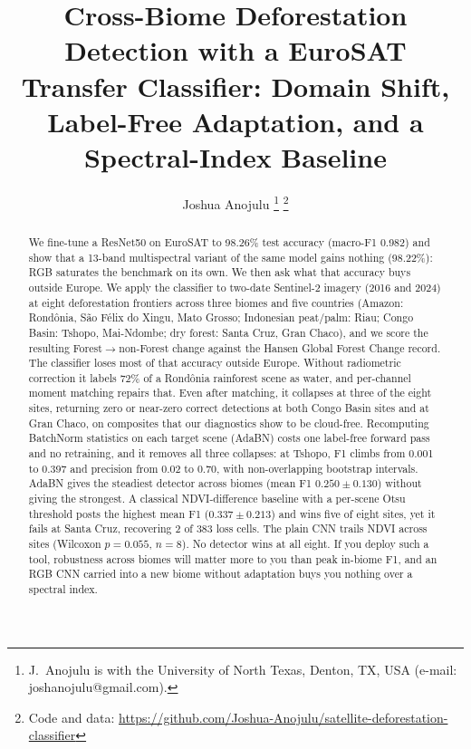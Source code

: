 \documentclass[journal]{IEEEtran}
\begin{document}
\title{Cross-Biome Deforestation Detection with a EuroSAT Transfer
Classifier: Domain Shift, Label-Free Adaptation, and a Spectral-Index Baseline}

\author{Joshua Anojulu%
\thanks{J.~Anojulu is with the University of North Texas, Denton, TX, USA (e-mail: joshanojulu@gmail.com).}%
\thanks{Code and data: \url{https://github.com/Joshua-Anojulu/satellite-deforestation-classifier}}}

\maketitle

\begin{abstract}
We fine-tune a ResNet50 on EuroSAT to 98.26\% test accuracy (macro-F1 0.982) and
show that a 13-band multispectral variant of the same model gains nothing
(98.22\%): RGB saturates the benchmark on its own. We then ask what that accuracy
buys outside Europe. We apply the classifier to two-date Sentinel-2 imagery (2016 and
2024) at eight deforestation frontiers across three biomes and five countries
(Amazon: Rond\^onia, S\~ao F\'elix do Xingu, Mato Grosso; Indonesian peat/palm:
Riau; Congo Basin: Tshopo, Mai-Ndombe; dry forest: Santa Cruz, Gran Chaco), and we
score the resulting Forest$\rightarrow$non-Forest change against the Hansen Global
Forest Change record. The classifier loses most of that accuracy outside Europe.
Without radiometric correction it labels 72\% of a Rond\^onia rainforest scene as
water, and per-channel moment matching repairs that. Even after matching, it
collapses at three of the eight sites, returning zero or near-zero correct
detections at both Congo Basin sites and at Gran Chaco, on composites that our
diagnostics show to be cloud-free. Recomputing BatchNorm statistics on each target
scene (AdaBN) costs one label-free forward pass and no retraining, and it removes
all three collapses: at Tshopo, F1 climbs from 0.001 to 0.397 and precision from
0.02 to 0.70, with non-overlapping bootstrap intervals. AdaBN gives the steadiest
detector across biomes (mean F1 $0.250\pm0.130$) without giving the strongest. A
classical NDVI-difference baseline with a per-scene Otsu threshold posts the highest
mean F1 ($0.337\pm0.213$) and wins five of eight sites, yet it fails at Santa Cruz,
recovering 2 of 383 loss cells. The plain CNN trails NDVI across sites (Wilcoxon
$p{=}0.055$, $n{=}8$). No detector wins at all eight. If you deploy such a tool,
robustness across biomes will matter more to you than peak in-biome F1, and an RGB
CNN carried into a new biome without adaptation buys you nothing over a spectral
index.
\end{abstract}
\end{document}
